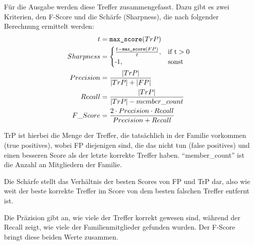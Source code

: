 \begin{enumerate}[a)]
                Für die Ausgabe werden diese Treffer zusammengefasst. Dazu gibt es zwei Kriterien, den F-Score und die Schärfe (Sharpness), die nach folgender Berechnung ermittelt werden:
                \begin{equation}
                    \begin{split}
                        t & = \texttt{max\_score}(TrP)\\
                        Sharpness & = \begin{cases}
                                          \frac{t-\texttt{max\_score}(FP)}{t},& \text{if t} > 0\\
                                          \sminus 1,& \text{sonst}
                                      \end{cases}\\
                        Precision & = \frac{|TrP|}{|TrP|+|FP|}\\
                        Recall & = \frac{|TrP|}{|TrP|-member\_count}\\
                        F\_Score & = \frac{2 \cdot Precision \cdot Recall}{Precision + Recall}
                    \end{split}
                \end{equation}

                TrP ist hierbei die Menge der Treffer, die tatsächlich in der Familie vorkommen (true positives), wobei FP diejenigen sind, die das nicht tun (false positives) und einen besseren Score als der letzte korrekte Treffer haben. ``member\_count'' ist die Anzahl an Mitgliedern der Familie.

                Die Schärfe stellt das Verhältnis der besten Scores von FP und TrP dar, also wie weit der beste korrekte Treffer im Score von dem besten falschen Treffer entfernt ist.

                Die Präzision gibt an, wie viele der Treffer korrekt gewesen sind, während der Recall zeigt, wie viele der Familienmitglieder gefunden wurden. Der F-Score bringt diese beiden Werte zusammen.


\end{enumerate}
